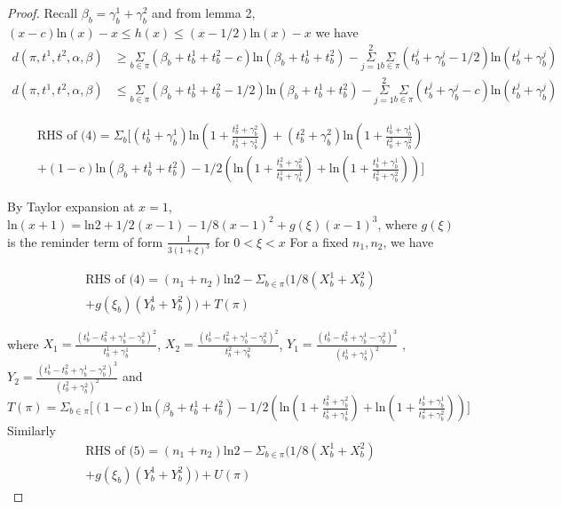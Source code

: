 \documentclass[aoas,preprint]{imsart}
\begin{document}
\begin{proof}
Recall $\beta_b = \gamma_b^1 + \gamma_b^2$ and from lemma 2, $(x - c)\text{ln}(x) - x \leq h(x) \leq (x - 1/2)\text{ln}(x) - x$ we have 
\begin{align}
d(\pi, t^1, t^2, \alpha, \beta) &\geq \underset{b\in \pi}\Sigma (\beta_b + t_b^1 + t_b^2 - c) \text{ln}(\beta_b  + t_b^1 + t_b^2) - \overset{2}{\underset{j = 1}{\Sigma}}\underset{b\in\pi}\Sigma (t_b^j + \gamma_b^j - 1/2) \text{ln}(t_b^j + \gamma_b^j)\\
d(\pi, t^1, t^2, \alpha, \beta) &\leq \underset{b\in \pi}\Sigma (\beta_b + t_b^1 + t_b^2 - 1 / 2) \text{ln}(\beta_b  + t_b^1 + t_b^2) - \overset{2}{\underset{j = 1}{\Sigma}}\underset{b\in\pi}\Sigma (t_b^j + \gamma_b^j - c) \text{ln}(t_b^j + \gamma_b^j)
\end{align}


\begin{eqnarray*}
\text{RHS of (4)} = \Sigma_b \big[ (t_b^1 + \gamma_b^1) \text{ln}(1 + \frac{t_b^2 + \gamma_b^2}{t_b^1 + \gamma_b^1})
 + (t_b^2 + \gamma_b^2) \text{ln}(1 + \frac{t_b^1 + \gamma_b^1}{t_b^2 + \gamma_b^2})\\
 + (1 - c) \text{ln}(\beta_b + t_b^1 + t_b^2) 
  - 1/2(\text{ln}(1 + \frac{t_b^2 + \gamma_b^2}{t_b^1 + \gamma_b^1}) + \text{ln}(1 + \frac{t_b^1 + \gamma_b^1}{t_b^2 + \gamma_b^2}))\big]
\end{eqnarray*}

By Taylor expansion at $x= 1$, $\text{ln}(x + 1) = \text{ln}2 + 1/2(x - 1) - 1/8(x - 1)^2 + g(\xi) (x - 1)^3$, where $g(\xi)$ is the reminder term of form $\frac{1}{3(1+\xi)^3}$ for $ 0 < \xi < x$
For a fixed $n_1, n_2$, we have 

\begin{eqnarray*}
\text{RHS of (4)} = (n_1 + n_2) \text{ln}2  - \Sigma_{b\in\pi}(1/8 (X_b^1 + X_b^2)\\
+ g(\xi_b) (Y_b^1 + Y_b^2) )+ T(\pi)
\end{eqnarray*}

where $X_1 = \frac{(t_b^1 - t_b^2 + \gamma_b^1 - \gamma_b^2)^2}{t_b^1 + \gamma_b^1}$, $X_2 =  \frac{(t_b^1 - t_b^2 + \gamma_b^1 - \gamma_b^2)^2}{t_b^2 + \gamma_b^2}$,
$Y_1 = \frac{(t_b^1 - t_b^2 + \gamma_b^1 - \gamma_b^2)^3}{(t_b^1 + \gamma_b^1)^2} $ , $Y_2 =  \frac{(t_b^1 - t_b^2 + \gamma_b^1 - \gamma_b^2)^3}{(t_b^2 + \gamma_b^2)^2}$
and $T(\pi) = \Sigma_{b\in\pi}\big[(1 - c) \text{ln}(\beta_b + t_b^1 + t_b^2) 
  - 1/2(\text{ln}(1 + \frac{t_b^2 + \gamma_b^2}{t_b^1 + \gamma_b^1}) + \text{ln}(1 + \frac{t_b^1 + \gamma_b^1}{t_b^2 + \gamma_b^2}))\big]$\\
Similarly
\begin{eqnarray*}
\text{RHS of (5)} = (n_1 + n_2) \text{ln}2  -\Sigma_{b\in\pi}(1/8 (X_b^1 + X_b^2)\\
+ g(\xi_b) (Y_b^1 + Y_b^2)) + U(\pi)
\end{eqnarray*}
  

\end{proof}
\end{document}
